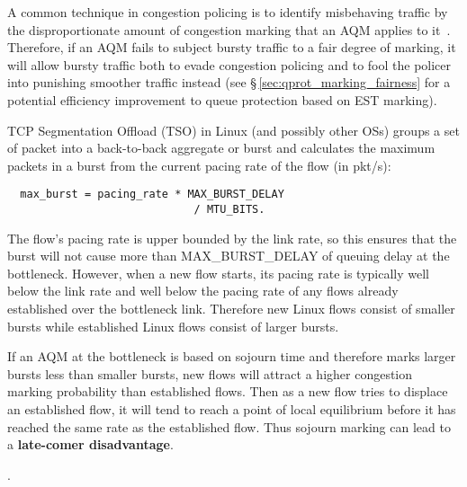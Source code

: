 A common technique in congestion policing is to identify misbehaving traffic by the disproportionate amount of congestion marking that an AQM applies to it~\cite{Floyd99:Penalty_box}. Therefore, if an AQM fails to subject bursty traffic to a fair degree of marking, it will allow bursty traffic both to evade congestion policing and to fool the policer into punishing smoother traffic instead (see \S\,\ref{sec:qprot_marking_fairness} for a potential efficiency improvement to queue protection based on EST marking).

TCP Segmentation Offload (TSO) in Linux (and possibly other OSs) groups a set of packet into a back-to-back aggregate or burst and calculates the maximum packets in a burst from the current pacing rate of the flow (in pkt/s):
\begin{verbatim}
  max_burst = pacing_rate * MAX_BURST_DELAY
                             / MTU_BITS.
\end{verbatim}
The flow's pacing rate is upper bounded by the link rate, so this ensures that the burst will not cause more than MAX\_BURST\_DELAY of queuing delay at the bottleneck. However, when a new flow starts, its pacing rate is typically well below the link rate and well below the pacing rate of any flows already established over the bottleneck link. Therefore new Linux flows consist of smaller bursts while established Linux flows consist of larger bursts. 

If an AQM at the bottleneck is based on sojourn time and therefore marks larger bursts less than smaller bursts, new flows will attract a higher congestion marking probability than established flows. Then as a new flow tries to displace an established flow, it will tend to reach a point of local equilibrium before it has reached the same rate as the established flow. Thus sojourn marking can lead to a \textbf{late-comer disadvantage}.

.

